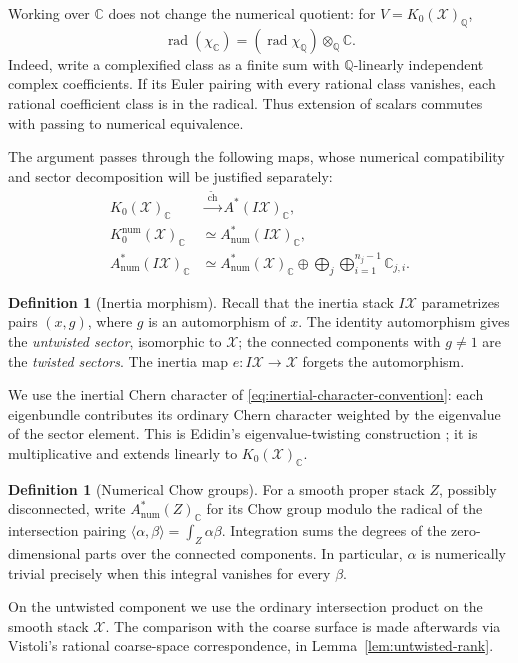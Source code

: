 \documentclass[11pt]{article}
\theoremstyle{plain}
\theoremstyle{definition}
\newtheorem{definition}[theorem]{Definition}
\theoremstyle{remark}
\newcommand{\cX}{\mathcal X}
\newcommand{\C}{\mathbb C}
\newcommand{\Q}{\mathbb Q}
\newcommand{\1}{\mathbf 1}
\begin{document}
Working over $\C$ does not change the numerical quotient: for $V=K_0(\cX)_{\Q}$,
\[
\operatorname{rad}(\chi_{\C})=(\operatorname{rad}\chi_{\Q})\otimes_{\Q}\C.
\]
Indeed, write a complexified class as a finite sum with $\Q$-linearly independent complex coefficients.  If its Euler pairing with every rational class vanishes, each rational coefficient class is in the radical.  Thus extension of scalars commutes with passing to numerical equivalence.

The argument passes through the following maps, whose numerical compatibility and sector decomposition will be justified separately:
\[
\begin{aligned}
K_0(\cX)_{\C}&\xrightarrow{\ \widetilde{\operatorname{ch}}\ } A^*(I\cX)_{\C},\\
K_0^{\mathrm{num}}(\cX)_{\C}&\simeq A^*_{\mathrm{num}}(I\cX)_{\C},\\
A^*_{\mathrm{num}}(I\cX)_{\C}&\simeq A^*_{\mathrm{num}}(\cX)_{\C}
\oplus\bigoplus_j\bigoplus_{i=1}^{n_j-1}\C_{j,i}.
\end{aligned}
\]

\begin{definition}[Inertia morphism]
Recall that the inertia stack $I\cX$ parametrizes pairs $(x,g)$, where $g$ is an automorphism of $x$.  The identity automorphism gives the \emph{untwisted sector}, isomorphic to $\cX$; the connected components with $g\ne1$ are the \emph{twisted sectors}.  The inertia map $e:I\cX\to\cX$ forgets the automorphism.
\end{definition}

We use the inertial Chern character of \eqref{eq:inertial-character-convention}: each eigenbundle contributes its ordinary Chern character weighted by the eigenvalue of the sector element.  This is Edidin's eigenvalue-twisting construction \cite[Section 4.3.2]{Edidin}; it is multiplicative and extends linearly to $K_0(\cX)_{\C}$.

\begin{definition}[Numerical Chow groups]
For a smooth proper stack $Z$, possibly disconnected, write $A^*_{\mathrm{num}}(Z)_{\C}$ for its Chow group modulo the radical of the intersection pairing $\langle\alpha,\beta\rangle=\int_Z\alpha\beta$.  Integration sums the degrees of the zero-dimensional parts over the connected components.  In particular, $\alpha$ is numerically trivial precisely when this integral vanishes for every $\beta$.
\end{definition}

On the untwisted component we use the ordinary intersection product on the smooth stack $\cX$.  The comparison with the coarse surface is made afterwards via Vistoli's rational coarse-space correspondence, in Lemma~\ref{lem:untwisted-rank}.
\end{document}
